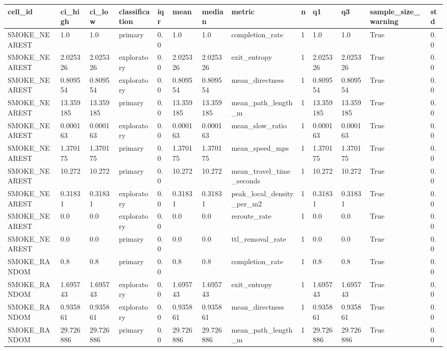 \begin{tabular}{lllllllllllll}
\hline
cell_id & ci_high & ci_low & classification & iqr & mean & median & metric & n & q1 & q3 & sample_size_warning & std \\
\hline
SMOKE\_NEAREST & 1.0 & 1.0 & primary & 0.0 & 1.0 & 1.0 & completion\_rate & 1 & 1.0 & 1.0 & True & 0.0 \\
SMOKE\_NEAREST & 2.025326 & 2.025326 & exploratory & 0.0 & 2.025326 & 2.025326 & exit\_entropy & 1 & 2.025326 & 2.025326 & True & 0.0 \\
SMOKE\_NEAREST & 0.809554 & 0.809554 & exploratory & 0.0 & 0.809554 & 0.809554 & mean\_directness & 1 & 0.809554 & 0.809554 & True & 0.0 \\
SMOKE\_NEAREST & 13.359185 & 13.359185 & primary & 0.0 & 13.359185 & 13.359185 & mean\_path\_length\_m & 1 & 13.359185 & 13.359185 & True & 0.0 \\
SMOKE\_NEAREST & 0.000163 & 0.000163 & exploratory & 0.0 & 0.000163 & 0.000163 & mean\_slow\_ratio & 1 & 0.000163 & 0.000163 & True & 0.0 \\
SMOKE\_NEAREST & 1.370175 & 1.370175 & primary & 0.0 & 1.370175 & 1.370175 & mean\_speed\_mps & 1 & 1.370175 & 1.370175 & True & 0.0 \\
SMOKE\_NEAREST & 10.272 & 10.272 & primary & 0.0 & 10.272 & 10.272 & mean\_travel\_time\_seconds & 1 & 10.272 & 10.272 & True & 0.0 \\
SMOKE\_NEAREST & 0.31831 & 0.31831 & exploratory & 0.0 & 0.31831 & 0.31831 & peak\_local\_density\_per\_m2 & 1 & 0.31831 & 0.31831 & True & 0.0 \\
SMOKE\_NEAREST & 0.0 & 0.0 & exploratory & 0.0 & 0.0 & 0.0 & reroute\_rate & 1 & 0.0 & 0.0 & True & 0.0 \\
SMOKE\_NEAREST & 0.0 & 0.0 & primary & 0.0 & 0.0 & 0.0 & ttl\_removal\_rate & 1 & 0.0 & 0.0 & True & 0.0 \\
SMOKE\_RANDOM & 0.8 & 0.8 & primary & 0.0 & 0.8 & 0.8 & completion\_rate & 1 & 0.8 & 0.8 & True & 0.0 \\
SMOKE\_RANDOM & 1.695743 & 1.695743 & exploratory & 0.0 & 1.695743 & 1.695743 & exit\_entropy & 1 & 1.695743 & 1.695743 & True & 0.0 \\
SMOKE\_RANDOM & 0.935861 & 0.935861 & exploratory & 0.0 & 0.935861 & 0.935861 & mean\_directness & 1 & 0.935861 & 0.935861 & True & 0.0 \\
SMOKE\_RANDOM & 29.726886 & 29.726886 & primary & 0.0 & 29.726886 & 29.726886 & mean\_path\_length\_m & 1 & 29.726886 & 29.726886 & True & 0.0 \\

\end{tabular}

